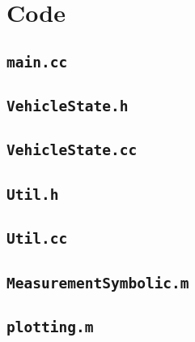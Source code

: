 \documentclass[11pt]{article}
\begin{document}
\section{Code}

\subsection{\texttt{main.cc}}


\subsection{\texttt{VehicleState.h}}


\subsection{\texttt{VehicleState.cc}}


\subsection{\texttt{Util.h}}


\subsection{\texttt{Util.cc}}



\subsection{\texttt{MeasurementSymbolic.m}}


\subsection{\texttt{plotting.m}}

\end{document}
